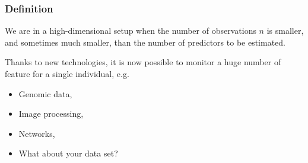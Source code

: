 \documentclass{beamer}\usepackage[]{graphicx}\usepackage[]{color}
\begin{document}
\begin{frame}
  \frametitle{Definition}

  \begin{definition}  We  are in  a  high-dimensional  setup when  the
    number of observations $n$  is smaller, and sometimes much smaller,
    than the number of predictors to be estimated.
  \end{definition}

  \vfill

  Thanks to new  technologies, it is now possible  to monitor a huge
  number of feature for a single individual, e.g.

  \vfill

  \begin{example}
    \begin{itemize}
    \item Genomic data,
    \item Image processing,
    \item Networks,
    \item What about your data set?
    \end{itemize}
  \end{example}

\end{frame}
\end{document}
